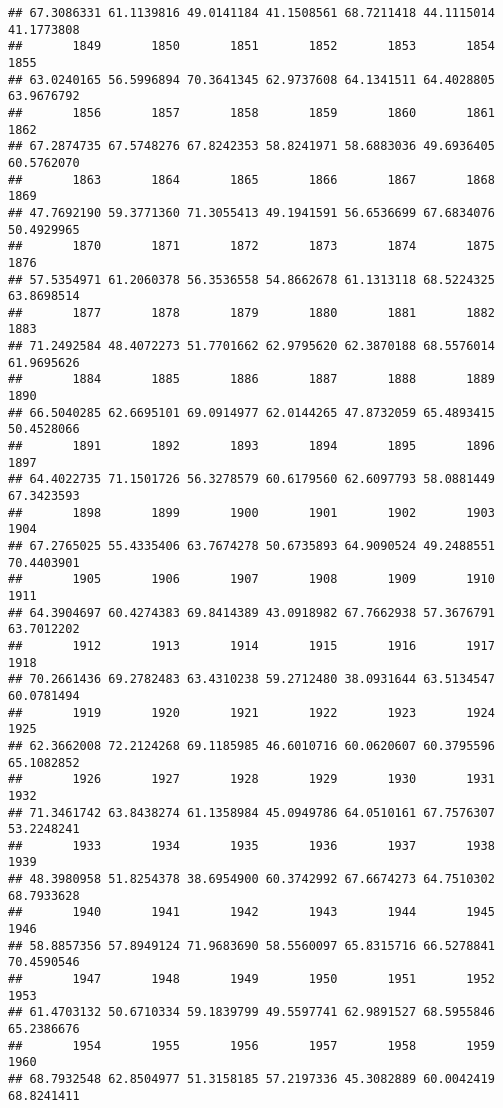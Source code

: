 \documentclass[
]{article}
\begin{document}
\begin{verbatim}
## 67.3086331 61.1139816 49.0141184 41.1508561 68.7211418 44.1115014 41.1773808 
##       1849       1850       1851       1852       1853       1854       1855 
## 63.0240165 56.5996894 70.3641345 62.9737608 64.1341511 64.4028805 63.9676792 
##       1856       1857       1858       1859       1860       1861       1862 
## 67.2874735 67.5748276 67.8242353 58.8241971 58.6883036 49.6936405 60.5762070 
##       1863       1864       1865       1866       1867       1868       1869 
## 47.7692190 59.3771360 71.3055413 49.1941591 56.6536699 67.6834076 50.4929965 
##       1870       1871       1872       1873       1874       1875       1876 
## 57.5354971 61.2060378 56.3536558 54.8662678 61.1313118 68.5224325 63.8698514 
##       1877       1878       1879       1880       1881       1882       1883 
## 71.2492584 48.4072273 51.7701662 62.9795620 62.3870188 68.5576014 61.9695626 
##       1884       1885       1886       1887       1888       1889       1890 
## 66.5040285 62.6695101 69.0914977 62.0144265 47.8732059 65.4893415 50.4528066 
##       1891       1892       1893       1894       1895       1896       1897 
## 64.4022735 71.1501726 56.3278579 60.6179560 62.6097793 58.0881449 67.3423593 
##       1898       1899       1900       1901       1902       1903       1904 
## 67.2765025 55.4335406 63.7674278 50.6735893 64.9090524 49.2488551 70.4403901 
##       1905       1906       1907       1908       1909       1910       1911 
## 64.3904697 60.4274383 69.8414389 43.0918982 67.7662938 57.3676791 63.7012202 
##       1912       1913       1914       1915       1916       1917       1918 
## 70.2661436 69.2782483 63.4310238 59.2712480 38.0931644 63.5134547 60.0781494 
##       1919       1920       1921       1922       1923       1924       1925 
## 62.3662008 72.2124268 69.1185985 46.6010716 60.0620607 60.3795596 65.1082852 
##       1926       1927       1928       1929       1930       1931       1932 
## 71.3461742 63.8438274 61.1358984 45.0949786 64.0510161 67.7576307 53.2248241 
##       1933       1934       1935       1936       1937       1938       1939 
## 48.3980958 51.8254378 38.6954900 60.3742992 67.6674273 64.7510302 68.7933628 
##       1940       1941       1942       1943       1944       1945       1946 
## 58.8857356 57.8949124 71.9683690 58.5560097 65.8315716 66.5278841 70.4590546 
##       1947       1948       1949       1950       1951       1952       1953 
## 61.4703132 50.6710334 59.1839799 49.5597741 62.9891527 68.5955846 65.2386676 
##       1954       1955       1956       1957       1958       1959       1960 
## 68.7932548 62.8504977 51.3158185 57.2197336 45.3082889 60.0042419 68.8241411 

\end{verbatim}
\end{document}
